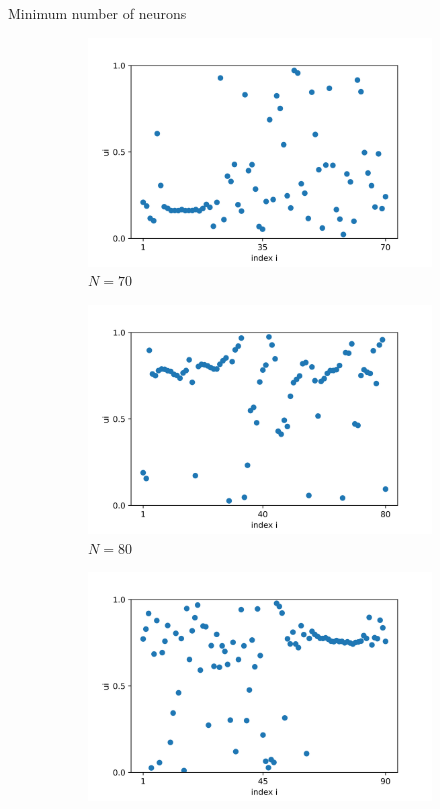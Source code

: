 \documentclass{beamer}
\begin{document}
\begin{frame}{Minimum number of neurons}
\begin{figure}[H]
\begin{subfigure}{.32\textwidth}
  \centering
  \includegraphics[width=1\linewidth]{u_N=70.png}  
  \caption{$N=70$}
\end{subfigure}
\begin{subfigure}{.32\textwidth}
  \centering
  \includegraphics[width=1\linewidth]{u_N=80.png}  
  \caption{$N=80$}
\end{subfigure}
\hfill
\begin{subfigure}{.32\textwidth}
  \centering
  \includegraphics[width=1\linewidth]{u_N=90.png}  

\end{subfigure}
\end{figure}
\end{frame}
\end{document}
